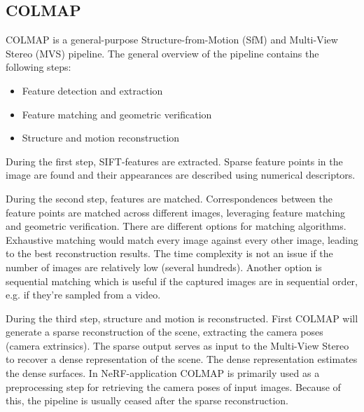 
\subsection{COLMAP} \label{sec:colmap}
COLMAP is a general-purpose Structure-from-Motion (SfM) \cite{schoenberger2016sfm} and Multi-View Stereo (MVS) \cite{schoenberger2016mvs} pipeline. The general overview of the pipeline contains the following steps:
\begin{itemize}
    \item Feature detection and extraction
    \item Feature matching and geometric verification
    \item Structure and motion reconstruction
\end{itemize}

During the first step, SIFT-features \cite{Lowe2004} are extracted. Sparse feature points in the image are found and their appearances are described using numerical descriptors.


During the second step, features are matched. Correspondences between the feature points are matched across different images, leveraging feature matching and geometric verification. There are different options for matching algorithms. Exhaustive matching would match every image against every other image, leading to the best reconstruction results. The time complexity is not an issue if the number of images are relatively low (several hundreds). Another option is sequential matching which is useful if the captured images are in sequential order, e.g. if they're sampled from a video.

During the third step, structure and motion is reconstructed. First COLMAP will generate a sparse reconstruction of the scene, extracting the camera poses (camera extrinsics). The sparse output serves as input to the Multi-View Stereo to recover a dense representation of the scene. The dense representation estimates the dense surfaces. In NeRF-application COLMAP is primarily used as a preprocessing step for retrieving the camera poses of input images. Because of this, the pipeline is usually ceased after the sparse reconstruction.

